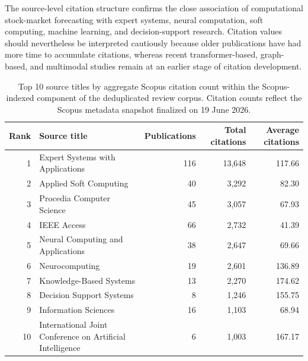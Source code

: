 \documentclass[pdflatex,sn-mathphys-num]{sn-jnl}%
\theoremstyle{thmstyleone}%
\theoremstyle{thmstyletwo}%
\theoremstyle{thmstylethree}%
\begin{document}
The source-level citation structure confirms the close association
of computational stock-market forecasting with expert systems,
neural computation, soft computing, machine learning, and
decision-support research. Citation values should nevertheless be
interpreted cautiously because older publications have had more
time to accumulate citations, whereas recent transformer-based,
graph-based, and multimodal studies remain at an earlier stage of
citation development.

\begin{table}[!t]
\centering
\caption{Top 10 source titles by aggregate Scopus citation count
within the Scopus-indexed component of the deduplicated review
corpus. Citation counts reflect the Scopus metadata snapshot
finalized on 19 June 2026.}
\label{tab:source-citation-impact}

\tiny
\setlength{\tabcolsep}{3.6pt}
\renewcommand{\arraystretch}{1.05}

\begin{tabular}{@{}rlrrr@{}}
\toprule
Rank &
Source title &
Publications &
Total citations &
Average citations \\
\midrule

1 &
Expert Systems with Applications &
116 &
13,648 &
117.66 \\

2 &
Applied Soft Computing &
40 &
3,292 &
82.30 \\

3 &
Procedia Computer Science &
45 &
3,057 &
67.93 \\

4 &
IEEE Access &
66 &
2,732 &
41.39 \\

5 &
Neural Computing and Applications &
38 &
2,647 &
69.66 \\

6 &
Neurocomputing &
19 &
2,601 &
136.89 \\

7 &
Knowledge-Based Systems &
13 &
2,270 &
174.62 \\

8 &
Decision Support Systems &
8 &
1,246 &
155.75 \\

9 &
Information Sciences &
16 &
1,103 &
68.94 \\

10 &
        International Joint Conference on Artificial Intelligence &
6 &
1,003 &
167.17 \\


\end{tabular}
\end{table}
\end{document}
